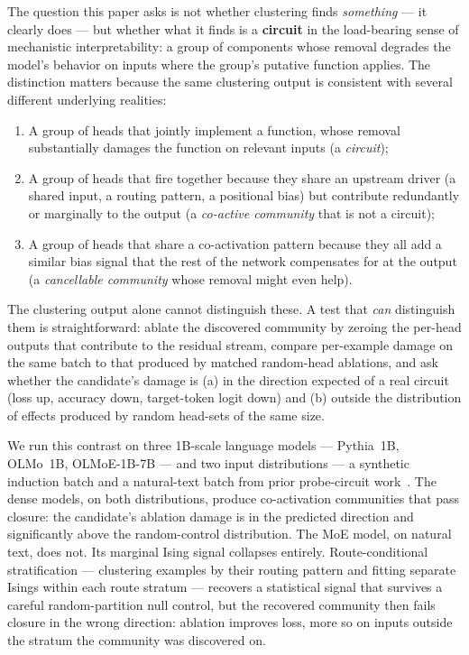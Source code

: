 \documentclass[11pt]{article}
\begin{document}
The question this paper asks is not whether clustering finds \emph{something}
--- it clearly does --- but whether what it finds is a \textbf{circuit} in
the load-bearing sense of mechanistic interpretability: a group of components
whose removal degrades the model's behavior on inputs where the group's
putative function applies. The distinction matters because the same
clustering output is consistent with several different underlying realities:

\begin{enumerate}
\item A group of heads that jointly implement a function, whose removal
  substantially damages the function on relevant inputs (a \emph{circuit});
\item A group of heads that fire together because they share an upstream
  driver (a shared input, a routing pattern, a positional bias) but
  contribute redundantly or marginally to the output (a \emph{co-active
  community} that is not a circuit);
\item A group of heads that share a co-activation pattern because they all
  add a similar bias signal that the rest of the network compensates for at
  the output (a \emph{cancellable community} whose removal might even help).
\end{enumerate}

The clustering output alone cannot distinguish these. A test that \emph{can}
distinguish them is straightforward: ablate the discovered community by
zeroing the per-head outputs that contribute to the residual stream, compare
per-example damage on the same batch to that produced by matched random-head
ablations, and ask whether the candidate's damage is (a) in the direction
expected of a real circuit (loss up, accuracy down, target-token logit down)
and (b) outside the distribution of effects produced by random head-sets of
the same size.

We run this contrast on three 1B-scale language models --- Pythia~1B,
OLMo~1B, OLMoE-1B-7B --- and two input distributions --- a synthetic induction
batch and a natural-text batch from prior probe-circuit work~\cite{xu2026}.
The dense models, on both distributions, produce co-activation communities
that pass closure: the candidate's ablation damage is in the predicted
direction and significantly above the random-control distribution. The MoE
model, on natural text, does not. Its marginal Ising signal collapses
entirely. Route-conditional stratification --- clustering examples by their
routing pattern and fitting separate Isings within each route stratum ---
recovers a statistical signal that survives a careful random-partition null
control, but the recovered community then fails closure in the wrong
direction: ablation improves loss, more so on inputs outside the stratum the
community was discovered on.
\end{document}
